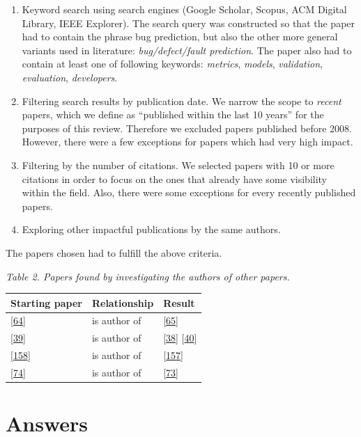 \documentclass[]{book}
\begin{document}
\begin{enumerate}
\def\labelenumi{\arabic{enumi}.}
\item
  Keyword search using search engines (Google Scholar, Scopus, ACM
  Digital Library, IEEE Explorer). The search query was constructed so
  that the paper had to contain the phrase bug prediction, but also the
  other more general variants used in literature: \emph{bug/defect/fault
  prediction}. The paper also had to contain at least one of following
  keywords: \emph{metrics}, \emph{models}, \emph{validation},
  \emph{evaluation}, \emph{developers}.
\item
  Filtering search results by publication date. We narrow the scope to
  \emph{recent} papers, which we define as ``published within the last
  10 years'' for the purposes of this review. Therefore we excluded
  papers published before 2008. However, there were a few exceptions for
  papers which had very high impact.
\item
  Filtering by the number of citations. We selected papers with 10 or
  more citations in order to focus on the ones that already have some
  visibility within the field. Also, there were some exceptions for
  every recently published papers.
\item
  Exploring other impactful publications by the same authors.
\end{enumerate}

The papers chosen had to fulfill the above criteria.

\emph{Table 2. Papers found by investigating the authors of other
papers.}

\begin{longtable}[]{@{}lll@{}}
\toprule
Starting paper & Relationship & Result\tabularnewline
\midrule
\endhead
{[}\protect\hyperlink{ref-DAmbros2010}{64}{]} & is author of &
{[}\protect\hyperlink{ref-DAmbros2012}{65}{]}\tabularnewline
{[}\protect\hyperlink{ref-Catal2009review}{39}{]} & is author of &
{[}\protect\hyperlink{ref-Catal2011}{38}{]}
{[}\protect\hyperlink{ref-Catal2009investigating}{40}{]}\tabularnewline
{[}\protect\hyperlink{ref-rahman2011}{158}{]} & is author of &
{[}\protect\hyperlink{ref-Rahman2013}{157}{]}\tabularnewline
{[}\protect\hyperlink{ref-Giger2011}{74}{]} & is author of &
{[}\protect\hyperlink{ref-giger2012}{73}{]}\tabularnewline
\bottomrule
\end{longtable}

\section{Answers}\label{answers-1}
\end{document}
